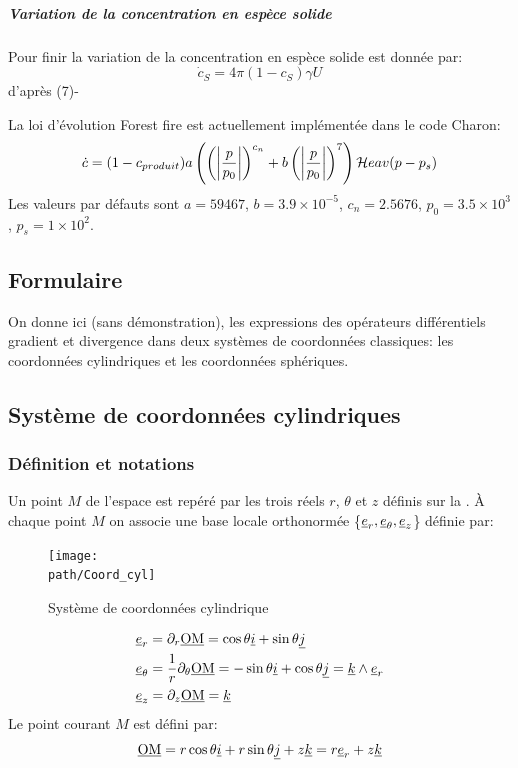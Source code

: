 \documentclass[10pt]{book}
\def\path{./fig}
\begin{document}
\paragraph{Variation de la concentration en espèce solide} Pour finir la variation de la concentration en espèce solide est donnée par:
$$\dot{c}_{S} = 4\pi(1-c_{S})\gamma U $$
d’après (7)-\cite{myint2020coupling}


La loi d'évolution Forest fire est actuellement implémentée dans le code Charon:
$$\dot{c} = (1-c_{produit})a\left(\left(\left|\dfrac{p}{p_{0}}\right|\right)^{c_{n}}+b\left(\left|\dfrac{p}{p_{0}}\right|\right)^{7}\right)\mathcal{H}eav(p-p_{s})$$
Les valeurs par défauts sont $a=59467$, $b=3.9\times 10^{-5}$, $c_{n}=2.5676$, $p_{0} = 3.5\times 10^{3}$, $p_{s}=1\times 10^{2}$.

\begin{appendices}
\chapter{Formulaire}\label{Annexe:Formulaire}
On donne ici (sans démonstration), les expressions des opérateurs différentiels gradient et divergence dans deux systèmes de coordonnées classiques: les coordonnées cylindriques et les coordonnées sphériques.

\section{Système de coordonnées cylindriques}
\subsection{Définition et notations}
Un point $M$ de l'espace est repéré par les trois réels $r$, $\theta$ et $z$ définis sur la . À chaque point $M$ on associe une base locale orthonormée \{$\underline{e}_{r},\underline{e}_{\theta},\underline{e}_{z}$\} définie par:
\begin{figure}[h]
\centering \texttt{[image: \\path/Coord\_cyl]}
\caption{Système de coordonnées cylindrique}
\label{fig:C_1}
\end{figure}
$$\begin{aligned}
&\underline{e}_{r}=\partial_{r}\underline{\mathrm{OM}}=\cos\theta\underline{i}+\sin\theta\underline{j}\\
&\underline{e}_{\theta}=\dfrac{1}{r}\partial_{\theta} \underline{\mathrm{OM}}=-\sin\theta\underline{i}+\cos\theta\underline{j}=\underline{k}\wedge \underline{e}_{r}\\
&\underline{e}_{z}=\partial_{z}\underline{\mathrm{OM}}=\underline{k}\\
\end{aligned}$$
Le point courant $M$ est défini par:
$$\underline{\mathrm{OM}}=r\cos\theta\underline{i}+r\sin\theta\underline{j}+z\underline{k}=r\underline{e}_{r}+z\underline{k}$$

\end{appendices}
\end{document}

